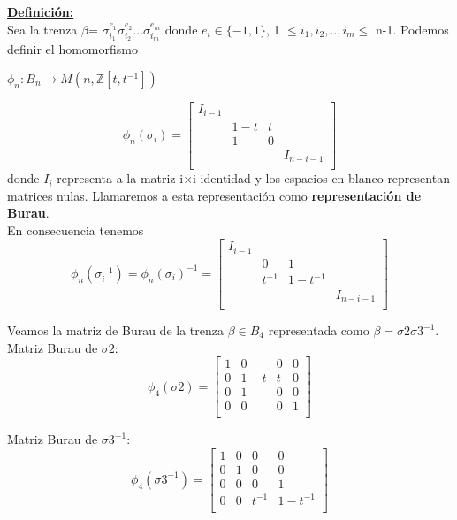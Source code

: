 \textbf{\underline{Definición:}}\\
Sea la trenza $\beta $= $\sigma_{i_{1}}^{e_{1}} \sigma_{i_{2}}^{e_{2}} ... \sigma_{i_{m}}^{e_{m}}$ donde $e_{i} \in \{-1,1\}$, 1 $\le i_{1}, i_{2},..,i_{m} \le$ n-1. Podemos definir el homomorfismo
\begin{center}
	 $ \phi_{n} : B_{n}  \rightarrow  M(n,\mathds{Z}[t,t^{-1}])$	 
\end{center}
\[ \phi_{n} ( \sigma_{i}) = \begin{bmatrix}
I_{i-1} &  &  & \\
 & 1-t & t &  \\
 & 1 & 0 &  \\
 &  &  & I_{n-i-1} \\
\end{bmatrix}\]
donde $ I_{i} $ representa a la matriz i$\times$i identidad y los espacios en blanco representan matrices nulas. Llamaremos a esta representación como \textbf{representación de Burau}.\\

En consecuencia tenemos 
	\[ \phi_{n} ( \sigma_{i}^{-1}) = \phi_{n} ( \sigma_{i})^{-1}= \begin{bmatrix}
	I_{i-1} &  &  & \\
	& 0 & 1 &  \\
	& t^{-1} & 1-t^{-1} &  \\	
	&  &  & I_{n-i-1} \\
	\end{bmatrix}\]


\bigskip
Veamos la matriz de Burau de la trenza $\beta \in B_{4}$ representada como $\beta = \sigma2\sigma3^{-1}$.\\
Matriz Burau de $ \sigma2 $:
	\[ \phi_{4} ( \sigma2) = \begin{bmatrix}
	1 & 0 & 0 & 0 \\
	0 & 1-t & t & 0  \\
	0 & 1 & 0 & 0 \\
	0 & 0 & 0 & 1 \\
	\end{bmatrix}\]

Matriz Burau de $ \sigma3^{-1} $:
\[ \phi_{4} ( \sigma3^{-1}) = \begin{bmatrix}
	1 & 0 & 0 & 0 \\
	0 & 1 & 0 & 0 \\
	0 & 0 & 0 & 1  \\	
	0 & 0 & t^{-1} & 1-t^{-1} \\
\end{bmatrix}\]
 
